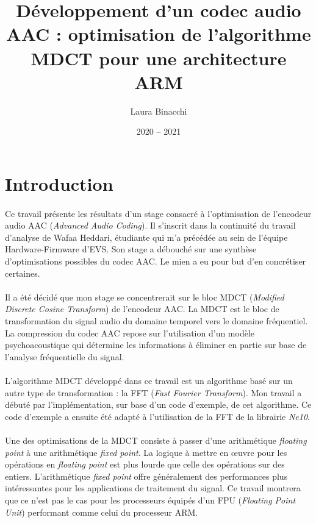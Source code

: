 \documentclass{article}
\title{Développement d'un codec audio AAC : optimisation de l'algorithme MDCT pour une architecture ARM}
\date{2020 -- 2021}
\author{Laura Binacchi}
\begin{document}
    
    \newpage
    

    \newpage
    \tableofcontents
    \newpage
    \listoffigures
    \newpage
    \printglossary[toctitle=\protect\numberline{}Glossaire]


    \newpage
    \section*{Introduction}

    \paragraph{}
    Ce travail présente les résultats d'un stage consacré à l'optimisation de l'encodeur audio AAC (\emph{Advanced Audio Coding}). Il s'inscrit dans la continuité du travail d'analyse de Wafaa Heddari, étudiante qui m'a précédée au sein de l'équipe Hardware-Firmware d'EVS. Son stage a débouché sur une synthèse d'optimisations possibles du codec AAC. Le mien a eu pour but d'en concrétiser certaines.

    \paragraph{}
    Il a été décidé que mon stage se concentrerait sur le bloc MDCT (\emph{Modified Discrete Cosine Transform}) de l'encodeur AAC. La MDCT est le bloc de transformation du signal audio du domaine temporel vers le domaine fréquentiel. La compression du codec AAC repose sur l'utilisation d'un modèle psychoacoustique qui détermine les informations à éliminer en partie sur base de l'analyse fréquentielle du signal.

    \paragraph{}
    L'algorithme MDCT développé dans ce travail est un algorithme basé sur un autre type de transformation : la FFT (\emph{Fast Fourier Transform}). Mon travail a débuté par l'implémentation, sur base d'un code d'exemple, de cet algorithme. Ce code d'exemple a ensuite été adapté à l'utilisation de la FFT de la librairie \emph{Ne10}.

    \paragraph{}
    Une des optimisations de la MDCT consiste à passer d'une arithmétique \emph{floating point} à une arithmétique \emph{fixed point}. La logique à mettre en \oe uvre pour les opérations en \emph{floating point} est plus lourde que celle des opérations sur des entiers. L'arithmétique \emph{fixed point} offre généralement des performances plus intéressantes pour les applications de traitement du signal. Ce travail montrera que ce n'est pas le cas pour les processeurs équipés d'un FPU (\emph{Floating Point Unit}) performant comme celui du processeur ARM.
\end{document}
